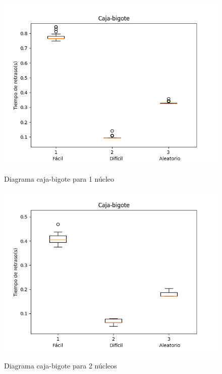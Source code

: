 \documentclass[a4paper, 11pt]{article}
\begin{document}
\begin{figure}[H]
  \centering      
  \caption{Diagrama caja-bigote para 1 núcleo}  
  \includegraphics[scale=.6]{CB_1núcleos.png}
  \label{f1}
\end{figure}
\begin{figure}[H]
  \centering      
  \caption{Diagrama caja-bigote para 2 núcleos}  
  \includegraphics[scale=.6]{CB_2núcleos.png}
  \label{f2}
\end{figure}
\end{document}
